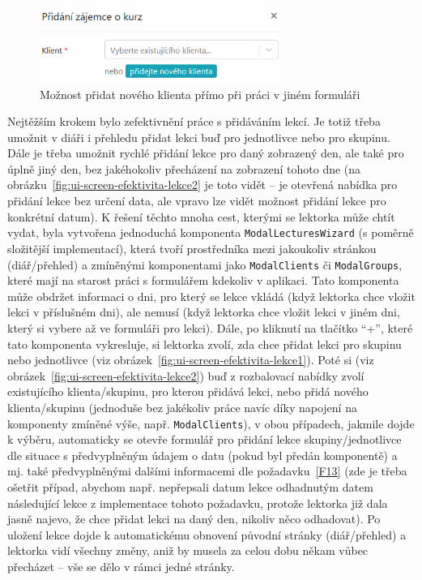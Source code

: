 \begin{figure}[h]\centering
    \includegraphics[width=0.7\textwidth]{img/ui-screen-efektivita-zajemci.png}
    \caption{Možnost přidat nového klienta přímo při práci v jiném formuláři}\label{fig:ui-screen-efektivita-zajemci}
\end{figure}

Nejtěžším krokem bylo zefektivnění práce s přidáváním lekcí. Je totiž třeba umožnit v diáři i přehledu přidat lekci buď pro jednotlivce nebo pro skupinu. Dále je třeba umožnit rychlé přidání lekce pro daný zobrazený den, ale také pro úplně jiný den, bez jakéhokoliv přecházení na zobrazení tohoto dne (na obrázku~\ref{fig:ui-screen-efektivita-lekce2} je toto vidět -- je otevřená nabídka pro přidání lekce bez určení data, ale vpravo lze vidět možnost přidání lekce pro konkrétní datum). K řešení těchto mnoha cest, kterými se lektorka může chtít vydat, byla vytvořena jednoduchá komponenta \verb|ModalLecturesWizard| (s poměrně složitější implementací), která tvoří prostředníka mezi jakoukoliv stránkou (diář/přehled) a zmíněnými komponentami jako \verb|ModalClients| či \verb|ModalGroups|, které mají na starost práci s formulářem kdekoliv v aplikaci. Tato komponenta může obdržet informaci o dni, pro který se lekce vkládá (když lektorka chce vložit lekci v příslušném dni), ale nemusí (když lektorka chce vložit lekci v jiném dni, který si vybere až ve formuláři pro lekci). Dále, po kliknutí na tlačítko \enquote{+}, které tato komponenta vykresluje, si lektorka zvolí, zda chce přidat lekci pro skupinu nebo jednotlivce (viz obrázek~\ref{fig:ui-screen-efektivita-lekce1}). Poté si (viz obrázek~\ref{fig:ui-screen-efektivita-lekce2}) buď z rozbalovací nabídky zvolí existujícího klienta/skupinu, pro kterou přidává lekci, nebo přidá nového klienta/skupinu (jednoduše bez jakékoliv práce navíc díky napojení na komponenty zmíněné výše, např. \verb|ModalClients|), v obou případech, jakmile dojde k výběru, automaticky se otevře formulář pro přidání lekce skupiny/jednotlivce dle situace s předvyplněným údajem o datu (pokud byl předán komponentě) a mj. také předvyplněnými dalšími informacemi dle požadavku~\ref{F13} (zde je třeba ošetřit případ, abychom např. nepřepsali datum lekce odhadnutým datem následující lekce z implementace tohoto požadavku, protože lektorka již dala jasně najevo, že chce přidat lekci na daný den, nikoliv něco odhadovat). Po uložení lekce dojde k automatickému obnovení původní stránky (diář/přehled) a lektorka vidí všechny změny, aniž by musela za celou dobu někam vůbec přecházet -- vše se dělo v rámci jedné stránky.

